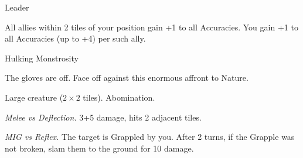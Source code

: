 \begin{monsterboxbg}{Leader}
    \begin{rpg-monsteraction}
    \end{rpg-monsteraction}


    \begin{rpg-monsteraction}
        All allies within 2 tiles of your position gain +1 to all Accuracies. You gain +1 to all Accuracies (up to +4) per such ally.
    \end{rpg-monsteraction}

\end{monsterboxbg}



\begin{monsterboxbg}{Hulking Monstrosity}

    The gloves are off. Face off against this enormous affront to Nature.
    
    \rpghline
    \stats[
        STR = \stat{20}, 
        DEX = \stat{14},
        CON = \stat{18},
        INT = \stat{10},
        WIS = \stat{10},
        CHA = \stat{12},
    ]
    \rpghline

    \basics[
    armorclass = 1,
    hitpoints  = 64,
    focus      = 5,
    defenses   = {Deflection 3, Reflex 3, Fortitude 9, Will 1}
    ]
    \rpghline

    \details[%
    skills = {Athletics 2},
    accuracies = {Melee 4, Ranged 0},
    challenge = Elite,
    ]
    \rpghline%
    \begin{rpg-monsteraction}
        Large creature ($2 \times 2$ tiles). Abomination.
    \end{rpg-monsteraction}

    

    \begin{rpg-monsteraction}
        \textit{Melee vs Deflection.} 3+5 damage, hits 2 adjacent tiles.
    \end{rpg-monsteraction}

    \begin{rpg-monsteraction}
        \textit{MIG vs Reflex.} The target is Grappled by you. After 2 turns, if the Grapple was not broken, slam them to the ground for 10 damage.
    \end{rpg-monsteraction}

    \begin{rpg-monsteraction}
    \end{rpg-monsteraction}


\end{monsterboxbg}
